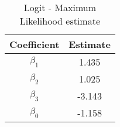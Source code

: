 \begin{table}[h!]
\centering
\caption{Logit - Maximum Likelihood estimate}\label{tab:mv}
\begin{tabular}{cc}
 \hline 
Coefficient & Estimate \\ \hline 
$\beta_1$ & 1.435 \\ 
$\beta_2$ & 1.025 \\ 
$\beta_3$ & -3.143 \\ 
$\beta_0$ & -1.158 \\ 
\hline
\end{tabular}
\end{table}

